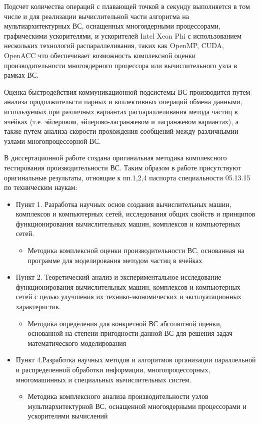 Подсчет количества операций с плавающей точкой в секунду выполняется в том числе и  для реализации вычислительной части алгоритма на мультиархитектурных ВС, оснащенных многоядерными процессорами, графическими ускорителями, и ускорителей Intel Xeon Phi с использованием нескольких технологий распараллеливания, таких как OpenMP, CUDA, OpenACC что обеспечивает возможность комплексной оценки производительности многоядерного  процессора или вычислительного узла в рамках ВС.

Оценка быстродействия коммуникационной подсистемы ВС производится путем анализа продолжительсти парных и коллективных операций обмена данными, используемых при различных вариантах распараллеливания метода частиц в ячейках (т.е. эйлеровом, эйлерово-лагранжевом и лагранжевом вариантах), а также путем анализа скорости прохождения сообщений между различнымии узлами многопроцессорной ВС.    

{}
В диссертационной работе создана оригинальная методика комплексного тестирования производительности ВС. Таким образом в работе присутствуют оригинальные результаты, отноящие к пп.1,2,4 паспорта специальности 05.13.15 по техническим наукам:
\begin{itemize}
	\item Пункт 1. Разработка научных основ создания вычислительных машин, комплексов и компьютерных сетей, исследования общих свойств и принципов функционирования вычислительных машин, комплексов и компьютерных сетей.
	\begin{itemize}
		
		\item Методика комплексной оценки производительности ВС, основанная на программе для моделирования методом частиц в ячейках
	\end{itemize}
	
	\item Пункт 2. Теоретический анализ и экспериментальное исследование функционирования вычислительных машин, комплексов и компьютерных сетей с целью улучшения их технико-экономических и эксплуатационных характеристик.
	\begin{itemize}
		
		\item Методика определения для конкретной ВС абсолютной оценки, основанной на степени пригодности данной ВС для решения задач математического моделирования
	\end{itemize}
	
	\item Пункт 4.Разработка научных методов и алгоритмов организации параллельной и распределенной обработки информации, многопроцессорных, многомашинных и специальных вычислительных систем.
	\begin{itemize}	
		\item Методика комплексного анализа производительности узлов мультиархитектурной ВС, оснащенной многоядерными процессорами и ускорителями вычислений
	\end{itemize}
\end{itemize}

